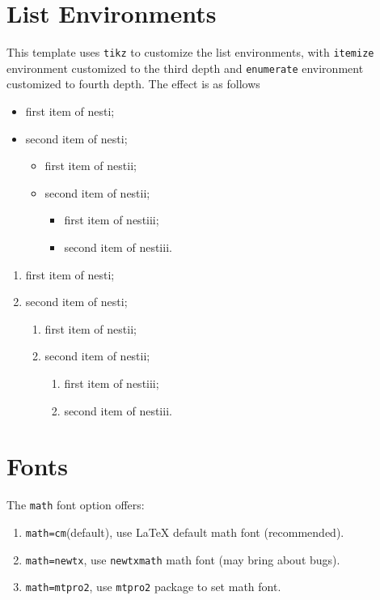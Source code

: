 \section{List Environments}
This template uses \lstinline{tikz} to customize the list environments, with \lstinline{itemize} environment customized to the third depth and \lstinline{enumerate} environment customized to fourth depth. The effect is as follows\\[2ex]
\begin{minipage}[b]{0.49\textwidth}
    \begin{itemize}
        \item first item of nesti;
        \item second item of nesti;
        \begin{itemize}
            \item first item of nestii;
            \item second item of nestii;
            \begin{itemize}
                \item first item of nestiii;
                \item second item of nestiii.
            \end{itemize}
        \end{itemize}
    \end{itemize}
\end{minipage}
\begin{minipage}[b]{0.49\textwidth}
    \begin{enumerate}
        \item first item of nesti;
        \item second item of nesti;
        \begin{enumerate}
            \item first item of nestii;
            \item second item of nestii;
            \begin{enumerate}
                \item first item of nestiii;
                \item second item of nestiii.
            \end{enumerate}
        \end{enumerate}
    \end{enumerate}
\end{minipage}


\section{Fonts}
The \lstinline{math} font option offers:
\begin{enumerate}
    \item \lstinline{math=cm}(default), use \LaTeX{} default math font (recommended).
    \item \lstinline{math=newtx}, use \lstinline{newtxmath} math font (may bring about bugs).
    \item \lstinline{math=mtpro2}, use \lstinline{mtpro2} package to set math font.
\end{enumerate}

